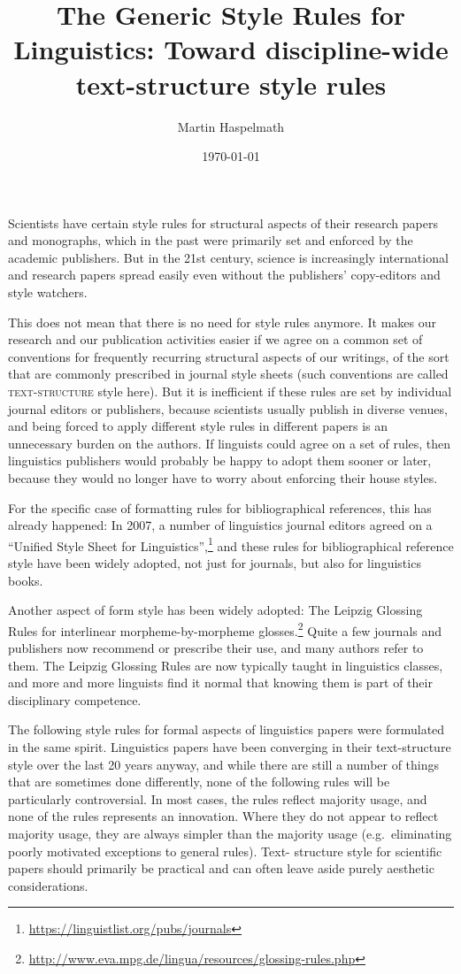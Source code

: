 \documentclass[a4paper]{article}
\date{\today}
\title{The Generic Style Rules for Linguistics: Toward discipline-wide text-structure style rules}
\author{Martin Haspelmath}
\begin{document}
\maketitle 

Scientists have
certain style rules for structural aspects of their research papers and
monographs, which in the past were primarily set and enforced by the
academic publishers. But in the 21st century, science is increasingly
international and research papers spread easily even without the
publishers' copy-editors and style watchers. 

This does not mean that
there is no need for style rules anymore. It makes our research and our
publication activities easier if we agree on a common set of conventions
for frequently recurring structural aspects of our writings, of the sort
that are commonly prescribed in journal style sheets (such conventions
are called \textsc{text-structure} style here). But it is inefficient if these
rules are set by individual journal editors or publishers, because
scientists usually publish in diverse venues, and being forced to apply
different style rules in different papers is an unnecessary burden on
the authors. If linguists could agree on a set of rules, then
linguistics publishers would probably be happy to adopt them sooner or
later, because they would no longer have to worry about enforcing their
house styles. 

For the specific case of formatting rules for
bibliographical references, this has already happened: In 2007, a number
of linguistics journal editors agreed on a ``Unified Style Sheet for
Linguistics'',\footnote{\url{https://linguistlist.org/pubs/journals}} and these rules for
bibliographical reference style have been widely adopted, not just for
journals, but also for linguistics books. 

Another aspect of form style
has been widely adopted: The Leipzig Glossing Rules for interlinear
morpheme-by-morpheme glosses.\footnote{\url{http://www.eva.mpg.de/lingua/resources/glossing-rules.php}}
Quite a few
journals and publishers now recommend or prescribe their use, and many
authors refer to them. The Leipzig Glossing Rules are now typically
taught in linguistics classes, and more and more linguists find it
normal that knowing them is part of their disciplinary competence. 

The following style rules for formal aspects of linguistics papers were
formulated in the same spirit. Linguistics papers have been converging
in their text-structure style over the last 20 years anyway, and while
there are still a number of things that are sometimes done differently,
none of the following rules will be particularly controversial. In most
cases, the rules reflect majority usage, and none of the rules
represents an innovation. Where they do not appear to reflect majority
usage, they are always simpler than the majority usage (e.g.~eliminating
poorly motivated exceptions to general rules). Text- structure style for
scientific papers should primarily be practical and can often leave
aside purely aesthetic considerations. 
\end{document}
